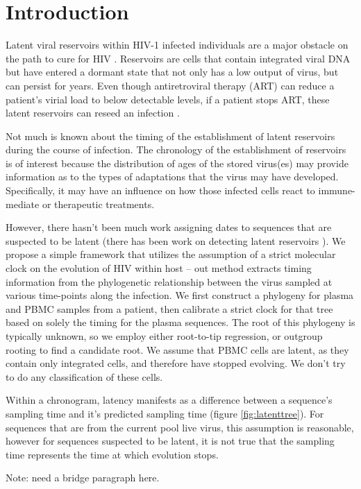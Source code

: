 \section{Introduction} \label{sec:intro}
Latent viral reservoirs within HIV-1 infected individuals are a major obstacle on the path to cure for HIV \citep{Pace11}. Reservoirs are cells that contain integrated viral DNA but have entered a dormant state that not only has a low output of virus, but can persist for years. Even though antiretroviral therapy (ART) can reduce a patient's virial load to below detectable levels, if a patient stops ART, these latent reservoirs can reseed an infection \citep{Joos08, Pomerantz03, Richman09}.

Not much is known about the timing of the establishment of latent reservoirs during the course of infection. The chronology of the establishment of reservoirs is of interest because the distribution of ages of the stored virus(es) may provide information as to the types of adaptations that the virus may have developed. Specifically, it may have an influence on how those infected cells react to immune-mediate or therapeutic treatments. 

However, there hasn't been much work assigning dates to sequences that are suspected to be latent (there has been work on detecting latent reservoirs \cite{Immonen14}). We propose a simple framework that utilizes the assumption of a strict molecular clock on the evolution of HIV within host -- out method extracts timing information from the phylogenetic relationship between the virus sampled at various time-points along the infection. We first construct a phylogeny for plasma and PBMC samples from a patient, then calibrate a strict clock for that tree based on solely the timing for the plasma sequences. The root of this phylogeny is typically unknown, so we employ either root-to-tip regression, or outgroup rooting to find a candidate root. We assume that PBMC cells are latent, as they contain only integrated cells, and therefore have stopped evolving. We don't try to do any classification of these cells.

Within a chronogram, latency manifests as a difference between a sequence's sampling time and it's predicted sampling time (figure \ref{fig:latenttree}). For sequences that are from the current pool live virus, this assumption is reasonable, however for sequences suspected to be latent, it is not true that the sampling time represents the time at which evolution stops.

Note: need a bridge paragraph here.


